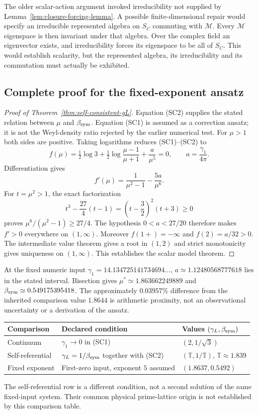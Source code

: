 The older scalar-action argument invoked irreducibility not supplied
by Lemma~\ref{lem:closure-forcing-lemma}. A possible finite-dimensional
repair would specify an irreducible represented algebra on $S_C$
commuting with $\mathcal M$. Every $\mathcal M$ eigenspace is then
invariant under that algebra. Over the complex field an eigenvector
exists, and irreducibility forces its eigenspace to be all of $S_C$.
This would establish scalarity, but the represented algebra, its
irreducibility and its commutation must actually be exhibited.

\subsection{Complete proof for the fixed-exponent ansatz}
\label{app:fixed-exponent-proof}

\begin{proof}[Proof of Theorem~\ref{thm:self-consistent-gL}]
Equation (SC2) supplies the stated relation between $\mu$ and
$\beta_{\mathrm{sym}}$. Equation (SC1) is assumed as a correction ansatz; it is
not the Weyl-density ratio rejected by the earlier numerical test.
For $\mu>1$ both sides are positive. Taking logarithms reduces
(SC1)--(SC2) to
\[
 f(\mu)=\tfrac12\log3+\tfrac12\log\frac{\mu-1}{\mu+1}
                 +\frac{a}{\mu^5}=0,
 \qquad a=\frac{\gamma_1}{4\pi}.
\]
Differentiation gives
\[
 f'(\mu)=\frac1{\mu^2-1}-\frac{5a}{\mu^6}.
\]
For $t=\mu^2>1$, the exact factorization
\[
 t^3-\frac{27}{4}(t-1)
       =\left(t-\frac32\right)^2(t+3)\geq0
\]
proves $\mu^6/(\mu^2-1)\geq27/4$. The hypothesis
$0<a<27/20$ therefore makes $f'>0$ everywhere on $(1,\infty)$.
Moreover $f(1+)=-\infty$ and $f(2)=a/32>0$. The intermediate
value theorem gives a root in $(1,2)$ and strict monotonicity gives
uniqueness on $(1,\infty)$. This establishes the scalar model theorem.
\end{proof}

At the fixed numeric input $\gamma_1=14.134725141734694\ldots$,
$a\simeq1.12480568777618$ lies in the stated interval. Bisection
gives $\mu^*\simeq1.863662249889$ and
$\beta_{\mathrm{sym}}\simeq0.549175395418$. The approximately $0.03957\%$
difference from the inherited comparison value $1.8644$ is arithmetic
proximity, not an observational uncertainty or a derivation of the ansatz.

\begin{center}
\small
\begin{tabular}{@{}p{}p{}p{}@{}}
\toprule
Comparison & Declared condition & Values $(\gamma_L,\beta_{\mathrm{sym}})$\\
\midrule
Continuum & $\gamma_1\to0$ in (SC1) & $(2,1/\sqrt3)$\\
Self-referential & $\gamma_L=1/\beta_{\mathrm{sym}}$ together with (SC2) &
$(\mathbb T,1/\mathbb T)$, $\mathbb T\approx1.839$\\
Fixed exponent & First-zero input, exponent $5$ assumed &
$(1.8637,0.5492)$\\
\bottomrule
\end{tabular}
\end{center}
The self-referential row is a different condition, not a second
solution of the same fixed-input system. Their common physical
prime-lattice origin is not established by this comparison table.

